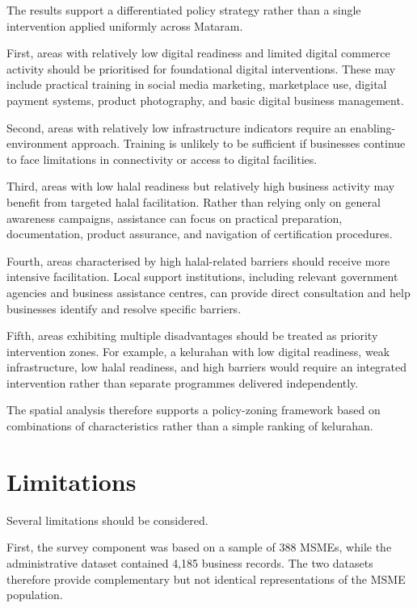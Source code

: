 \documentclass[
  default,
]{sn-jnl}
\begin{document}
The results support a differentiated policy strategy rather than a
single intervention applied uniformly across Mataram.

First, areas with relatively low digital readiness and limited digital
commerce activity should be prioritised for foundational digital
interventions. These may include practical training in social media
marketing, marketplace use, digital payment systems, product
photography, and basic digital business management.

Second, areas with relatively low infrastructure indicators require an
enabling-environment approach. Training is unlikely to be sufficient if
businesses continue to face limitations in connectivity or access to
digital facilities.

Third, areas with low halal readiness but relatively high business
activity may benefit from targeted halal facilitation. Rather than
relying only on general awareness campaigns, assistance can focus on
practical preparation, documentation, product assurance, and navigation
of certification procedures.

Fourth, areas characterised by high halal-related barriers should
receive more intensive facilitation. Local support institutions,
including relevant government agencies and business assistance centres,
can provide direct consultation and help businesses identify and resolve
specific barriers.

Fifth, areas exhibiting multiple disadvantages should be treated as
priority intervention zones. For example, a kelurahan with low digital
readiness, weak infrastructure, low halal readiness, and high barriers
would require an integrated intervention rather than separate programmes
delivered independently.

The spatial analysis therefore supports a policy-zoning framework based
on combinations of characteristics rather than a simple ranking of
kelurahan.

\section{Limitations}\label{limitations}

Several limitations should be considered.

First, the survey component was based on a sample of 388 MSMEs, while
the administrative dataset contained 4,185 business records. The two
datasets therefore provide complementary but not identical
representations of the MSME population.
\end{document}
